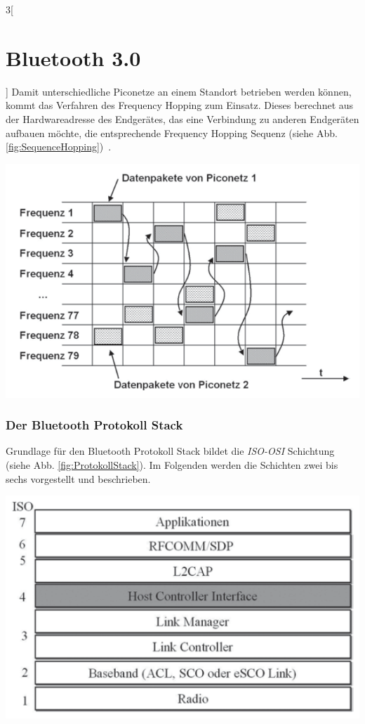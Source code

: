 \begin{multicols}{3}[\section{Bluetooth 3.0}]
Damit unterschiedliche Piconetze an einem Standort betrieben werden können, kommt das Verfahren des Frequency Hopping zum Einsatz. Dieses berechnet aus der Hardwareadresse des Endgerätes, das eine Verbindung zu anderen Endgeräten aufbauen möchte, die entsprechende Frequency Hopping Sequenz (siehe Abb. \ref{fig:SequenceHopping})~\cite{bluetooth3.0.3}.

\begin{Figure}
\includegraphics[width=\linewidth]{Kapitel/Bluetooth3.0/Grafiken/frequencehopping.png}
\label{fig:SequenceHopping}
\end{Figure}

\subsubsection*{Der Bluetooth Protokoll Stack}
Grundlage für den Bluetooth Protokoll Stack bildet die \textit{ISO-OSI} Schichtung (siehe Abb. \ref{fig:ProtokollStack}). Im Folgenden werden die Schichten zwei bis sechs vorgestellt und beschrieben.

\begin{Figure}
\includegraphics[width=\linewidth]{Kapitel/Bluetooth3.0/Grafiken/Protokoll_Stack.png}
\label{fig:ProtokollStack}
\end{Figure}


\end{multicols}
